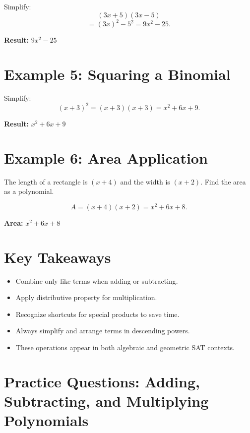 \documentclass[12pt]{article}
\begin{document}
Simplify:
\[
(3x + 5)(3x - 5)
\]
\[
= (3x)^2 - 5^2 = 9x^2 - 25.
\]

\textbf{Result:} \(\boxed{9x^2 - 25}\)

\section*{Example 5: Squaring a Binomial}

Simplify:
\[
(x + 3)^2 = (x + 3)(x + 3) = x^2 + 6x + 9.
\]

\textbf{Result:} \(\boxed{x^2 + 6x + 9}\)

\section*{Example 6: Area Application}

The length of a rectangle is \((x + 4)\) and the width is \((x + 2)\).  
Find the area as a polynomial.

\[
A = (x + 4)(x + 2) = x^2 + 6x + 8.
\]

\textbf{Area:} \(\boxed{x^2 + 6x + 8}\)

\section*{Key Takeaways}
\begin{itemize}
  \item Combine only like terms when adding or subtracting.
  \item Apply distributive property for multiplication.
  \item Recognize shortcuts for special products to save time.
  \item Always simplify and arrange terms in descending powers.
  \item These operations appear in both algebraic and geometric SAT contexts.
\end{itemize}

\newpage


\section*{Practice Questions: Adding, Subtracting, and Multiplying Polynomials}
\end{document}
